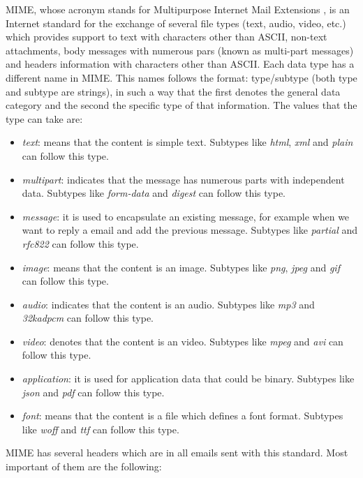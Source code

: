 MIME, whose acronym stands for Multipurpose Internet Mail Extensions \citep{wikimime}, is an Internet standard for the exchange of several file types (text, audio, video, etc.) which provides support to text with characters other than ASCII, non-text attachments, body messages with numerous pars (known as multi-part messages) and headers information with characters other than ASCII. Each data type has a different name in MIME. This names follows the format: type/subtype (both type and subtype are strings), in such a way that the first denotes the general data category and the second the specific type of that information. The values that the type can take are:

\begin{itemize}
	\item\textit{text}: means that the content is simple text. Subtypes like \textit{html}, \textit{xml} and \textit{plain} can follow this type.
	\item\textit{multipart}: indicates that the message has numerous parts with independent data. Subtypes like \textit{form-data} and \textit{digest} can follow this type.
	\item\textit{message}: it is used to encapsulate an existing message, for example when we want to reply a email and add the previous message. Subtypes like \textit{partial} and \textit{rfc822} can follow this type.
	\item\textit{image}: means that the content is an image. Subtypes like \textit{png}, \textit{jpeg} and \textit{gif} can follow this type.
	\item\textit{audio}: indicates that the content is an audio. Subtypes like \textit{mp3} and \textit{32kadpcm} can follow this type.
	\item\textit{video}: denotes that the content is an video. Subtypes like \textit{mpeg} and \textit{avi} can follow this type.
	\item\textit{application}: it is used for application data that could be binary. Subtypes like \textit{json} and \textit{pdf} can follow this type.
	\item\textit{font}: means that the content is a file which defines a font format. Subtypes like \textit{woff} and \textit{ttf} can follow this type.
\end{itemize}

MIME has several headers which are in all emails sent with this standard. Most important of them are the following:

